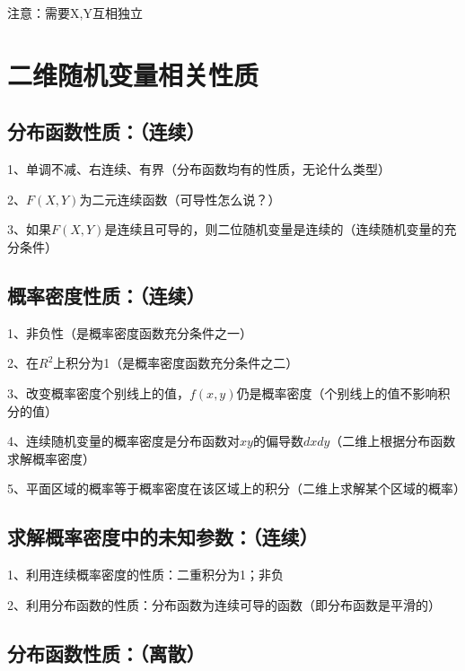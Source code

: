 注意：需要X,Y互相独立

\section{二维随机变量相关性质}



\subsection{分布函数性质：（连续）}

1、单调不减、右连续、有界（分布函数均有的性质，无论什么类型）

2、$ F(X,Y) $为二元连续函数（可导性怎么说？）

3、如果$ F(X,Y) $是连续且可导的，则二位随机变量是连续的（连续随机变量的充分条件）



\subsection{概率密度性质：（连续）}

1、非负性（是概率密度函数充分条件之一）

2、在$ R^2 $上积分为1（是概率密度函数充分条件之二）

3、改变概率密度个别线上的值，$ f(x,y) $仍是概率密度（个别线上的值不影响积分的值）

4、连续随机变量的概率密度是分布函数对$ xy $的偏导数$ dxdy $（二维上根据分布函数求解概率密度）

5、平面区域的概率等于概率密度在该区域上的积分（二维上求解某个区域的概率）



\subsection{求解概率密度中的未知参数：（连续）}

1、利用连续概率密度的性质：二重积分为1；非负

2、利用分布函数的性质：分布函数为连续可导的函数（即分布函数是平滑的）



\subsection{分布函数性质：（离散）}

